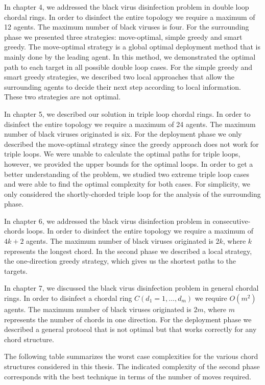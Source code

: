 In chapter  4, we addressed the black virus disinfection problem in double loop chordal rings. In order to disinfect the entire topology we require a maximum of 12 agents. The maximum number of black viruses is four. For the surrounding phase we presented three strategies:  move-optimal, simple greedy and smart greedy.  The move-optimal strategy is a global optimal deployment method that is mainly done by the leading agent. In this method, we demonstrated the optimal path to each target in all possible double loop cases.
For the simple greedy and smart greedy strategies, we described two local approaches that allow the surrounding agents to decide their next step according to local information. These two strategies are not optimal.

In chapter 5, we described our solution in triple loop chordal rings. In order to disinfect the entire topology we require a maximum of 24 agents. The maximum number of black viruses originated is six. For the deployment phase we only described the move-optimal strategy since the greedy approach does not work for triple loops. We were unable to calculate the optimal paths for triple loops, however, we provided the upper bounds for the optimal loops. In order to get a better understanding of the problem, we studied two extreme triple loop cases and were able to find the optimal complexity for both cases. For simplicity, we only considered the shortly-chorded triple loop for the analysis of the surrounding phase. 

In chapter 6, we addressed the black virus disinfection problem in  consecutive-chords loops. In order to disinfect the entire topology we require a maximum of $4k+2$ agents. The maximum number of black viruses originated is $2k$, where $k$ represents the longest chord. In the second phase we described a local strategy, the one-direction greedy strategy, which gives us the shortest paths to the targets.

In chapter 7, we discussed the black virus disinfection problem in general  chordal rings. In order to disinfect a chordal ring $C(d_1=1,\ldots, d_m)$ we require  $O(m^2)$ agents. The maximum number of black viruses originated is  $2m$, where $m$ represents the number of chords in one direction. For the deployment phase we described a general protocol that is not optimal but that works correctly for any chord structure.

The following table summarizes the worst case complexities for the various chord structures considered in this thesis. The indicated complexity of the second phase corresponds with the best technique in terms of the number of moves required. 

